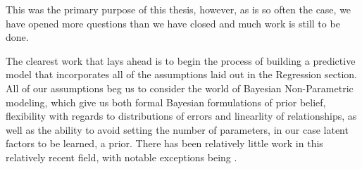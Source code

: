 \documentclass[a4paper,12pt]{article}
\begin{document}
This was the primary purpose of this thesis, however, as is so often the case, we have opened more questions than we have closed and much work is still to be done.

The clearest work that lays ahead is to begin the process of building a predictive model that incorporates all of the assumptions laid out in the Regression section. All of our assumptions beg us to consider the world of Bayesian Non-Parametric modeling, which give us both formal Bayesian formulations of prior belief, flexibility with regards to distributions of errors and linearlity of relationships, as well as the ability to avoid setting the number of parameters, in our case latent factors to be learned, a prior. There has been relatively little work in this relatively recent field, with notable exceptions being \cite{}.



\printbibliography
\end{document}
